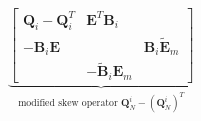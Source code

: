 \documentclass[compress]{beamer}
\theoremstyle{plain}
\renewcommand{\tilde}{\widetilde}
\newcommand{\td}[2]{\frac{{\rm d}#1}{{\rm d}{\rm #2}}}
\newcommand{\LRp}[1]{\left( #1 \right)}
\begin{document}
{{\begin{columns}
\begin{figure}
\centering
\begin{overlayarea}{\textwidth}{.375\textheight}
\end{overlayarea}
\end{figure}

\begin{equation*}
\underbrace{\begin{bmatrix}
\bm{Q}_i-\bm{Q}_i^T & \bm{E}^T\bm{B}_i &\\
-\bm{B}_i\bm{E} &  & \bm{B}_i\tilde{\bm{E}}_m \\
& -\tilde{\bm{B}}_i{\bm{E}}_m & 
\end{bmatrix}}_{\text{modified skew operator } \bm{Q}^i_N- \LRp{\bm{Q}^i_N}^T}
\end{equation*}


\end{columns}}}
\end{document}
